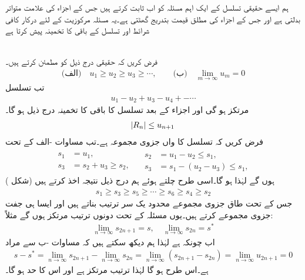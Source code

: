 ہم ایسے حقیقی تسلسل کے ایک اہم مسئلہ کو اب ثابت کرتے ہیں جس کے اجزاء کی علامت متواتر بدلتی ہے اور جس کے اجزاء کی مطلق قیمت بتدریج گھٹتی ہے۔یہ مسئلہ مرکوزیت کے لئے درکار کافی شرائط  اور تسلسل کے باقی کا تخمینہ پیش کرتا ہے

\quad {}\\
فرض کریں کہ حقیقی  درج ذیل کو مطمئن کرتے ہیں۔
\begin{align}\label{مسئلہ_ترتیب_آزمائش_لیبنٹز_الف}
\text{(الف)}\quad u_1\ge u_2\ge u_3\ge \cdots,\quad \quad \text{(ب)}\quad \lim_{m\to\infty} u_m=0
\end{align}
تب تسلسل
\begin{align*}
u_1-u_2+u_3-u_4+-\cdots
\end{align*}
مرتکز ہو گی اور  اجزاء کے بعد تسلسل کا باقی کا تخمینہ درج ذیل ہو گا۔
\begin{align}\label{مسئلہ_ترتیب_آزمائش_لیبنٹز_ب}
\abs{R_n}\le u_{n+1}
\end{align}
\quad
فرض کریں کہ  تسلسل کا  واں جزوی مجموعہ ہے۔تب  مساوات -الف کے تحت 
\begin{gather*}
\begin{aligned}
s_1&=u_1,\\
s_3&=s_2+u_3\ge s_2,
\end{aligned}\quad
\begin{aligned}
 s_2&=u_1-u_2\le s_1,\\
 s_3&=s_1-(u_2-u_3)\le s_1,
\end{aligned}
\end{gather*}
ہوں گے لہٰذا  ہو گا۔اسی طرح چلتے ہوئے ہم درج ذیل نتیجہ اخذ کرتے ہیں (شکل )
\begin{align}\label{مسئلہ_ترتیب_آزمائش_لیبنٹز_پ}
s_1\ge s_3\ge s_5\ge \cdots\ge s_6\ge s_4\ge s_2
\end{align}
جس کے تحت طاق جزوی مجموعے محدود یک سر ترتیب بناتے ہیں اور ایسا ہی جفت جزوی مجموعے کرتے ہیں۔یوں مسئلہ  کے تحت دونوں ترتیب مرتکز ہوں گے مثلاً:
\begin{align*}
\lim_{n\to\infty} s_{2n+1}=s,\quad \lim_{n\to\infty} s_{2n}=s^*
\end{align*} 
اب چونکہ  ہے لہٰذا ہم دیکھ سکتے ہیں کہ مساوات -ب سے مراد 
\begin{align*}
s-s^*=\lim_{n\to\infty}s_{2n+1}-\lim_{n\to\infty}s_{2n}=\lim_{n\to\infty}(s_{2n+1}-s_{2n})=\lim_{n\to\infty} u_{2n+1}=0
\end{align*}
ہے۔اس طرح   ہو گا لہٰذا  ترتیب مرتکز ہے اور اس کا حد  ہو گا۔

